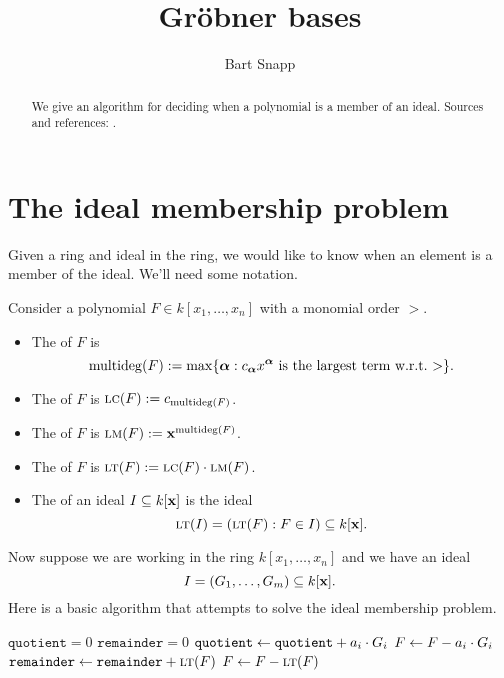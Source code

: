 \documentclass{ximera}
\title{Gr\"obner bases}
\author{Bart Snapp}
\begin{document}
\begin{abstract}
  We give an algorithm for deciding when a polynomial is a member of
  an ideal.  Sources and references: \cite{CLO2007,hS2003}.
\end{abstract}
\maketitle



\section{The ideal membership problem}

Given a ring and ideal in the ring, we would like to know when an
element is a member of the ideal. We'll need some notation.


\begin{definition}
  Consider a polynomial $F\in k[x_1,\dots, x_n]$ with a monomial order
  $>$.
  \begin{itemize}
    \item The  of $F$ is
    \[
    \operatorname{multideg}(F) := \max\{{\boldsymbol\alpha}: \text{$c_{\boldsymbol\alpha} x^{\boldsymbol\alpha}$ is the largest term w.r.t.\ $>$} \}.
    \]
  \item The  of $F$ is $\textsc{lc}(F) := c_{\operatorname{multideg}(F)}$.
  \item The  of $F$ is $\textsc{lm}(F) := \mathbf{x}^{\operatorname{multideg}(F)}$.
  \item The  of $F$ is $\textsc{lt}(F) := \textsc{lc}(F)\cdot \textsc{lm}(F)$.
  \item The  of an ideal $I\subseteq k[\mathbf{x}]$ is
    the ideal
    \[
    \textsc{lt}(I) = (\textsc{lt}(F): F\in I)\subseteq k[\mathbf{x}].
    \]
  \end{itemize}
\end{definition}

Now suppose we are working in the ring $k[x_1,\dots, x_n]$ and we have an ideal
\[
I = (G_1,\dots, G_m) \subseteq k[\mathbf{x}].
\]
Here is a basic algorithm that attempts to solve the ideal membership
problem.

\begin{algorithm}
  \hfill
  \begin{algorithmic}[1]
    \State $\texttt{quotient} = 0$
    \State $\texttt{remainder} = 0$
    \Repeat
    \State $\texttt{quotient} \leftarrow \texttt{quotient} + a_i\cdot G_i$
    \State $F \leftarrow F - a_i\cdot G_i$
    \Else
    \State $\texttt{remainder} \leftarrow \texttt{remainder} + \textsc{lt}(F)$
    \State $F\leftarrow F- \textsc{lt}(F)$
    \EndIf
  \end{algorithmic}
\end{algorithm}
\end{document}
